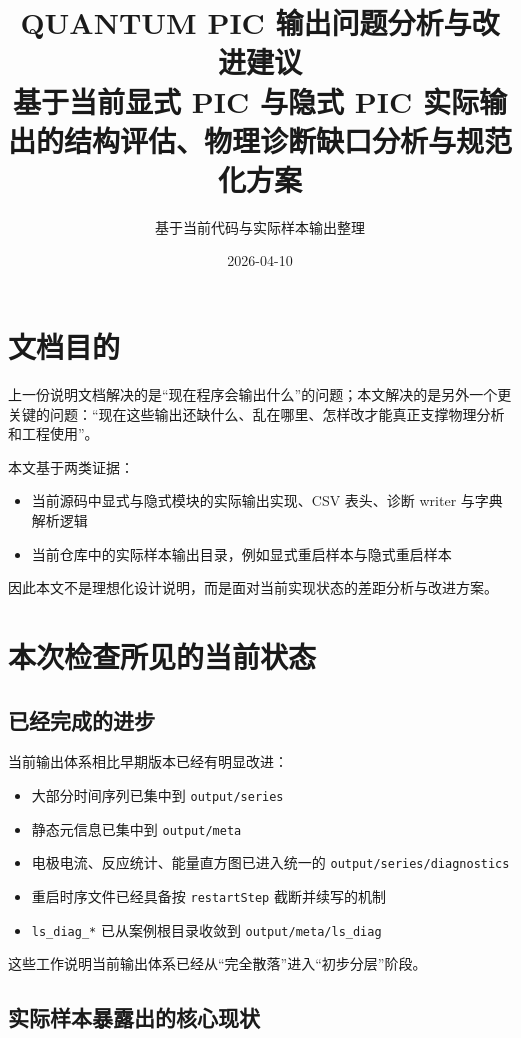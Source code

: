 \documentclass[11pt,a4paper]{ctexart}
\title{QUANTUM PIC 输出问题分析与改进建议\\\large 基于当前显式 PIC 与隐式 PIC 实际输出的结构评估、物理诊断缺口分析与规范化方案}
\author{基于当前代码与实际样本输出整理}
\date{2026-04-10}
\newcommand{\code}[1]{\texttt{#1}}
\newcommand{\dir}[1]{\texttt{#1}}
\begin{document}
\maketitle
\tableofcontents
\newpage

\section{文档目的}

上一份说明文档解决的是``现在程序会输出什么''的问题；本文解决的是另外一个更关键的问题：``现在这些输出还缺什么、乱在哪里、怎样改才能真正支撑物理分析和工程使用''。

本文基于两类证据：

\begin{itemize}
  \item 当前源码中显式与隐式模块的实际输出实现、CSV 表头、诊断 writer 与字典解析逻辑
  \item 当前仓库中的实际样本输出目录，例如显式重启样本与隐式重启样本
\end{itemize}

因此本文不是理想化设计说明，而是面对当前实现状态的差距分析与改进方案。

\section{本次检查所见的当前状态}

\subsection{已经完成的进步}

当前输出体系相比早期版本已经有明显改进：

\begin{itemize}
  \item 大部分时间序列已集中到 \dir{output/series}
  \item 静态元信息已集中到 \dir{output/meta}
  \item 电极电流、反应统计、能量直方图已进入统一的 \dir{output/series/diagnostics}
  \item 重启时序文件已经具备按 \code{restartStep} 截断并续写的机制
  \item \code{ls\_diag\_*} 已从案例根目录收敛到 \dir{output/meta/ls\_diag}
\end{itemize}

这些工作说明当前输出体系已经从``完全散落''进入``初步分层''阶段。

\subsection{实际样本暴露出的核心现状}
\end{document}
